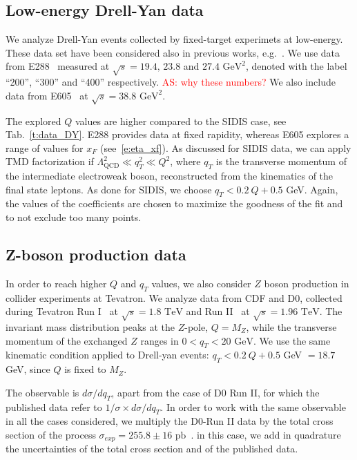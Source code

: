 \documentclass[aps,preprintnumbers,showpacs,nofootinbib,superscriptaddress,floatfix]{revtex4}
\begin{document}
\subsection{Low-energy Drell-Yan data}
\label{ss:dy}

We analyze Drell-Yan events collected by fixed-target experimets at low-energy. These data set have been considered also in previous works, e.g.~\cite{DAlesio:2014mrz}. 
We use data from E288~\cite{Ito:1980ev} measured at $\sqrt{s}=19.4,\,23.8$ and $27.4\text{ GeV}^2$, denoted with the label ``200'', ``300'' and ``400'' respectively. \textcolor{red}{AS: why these numbers?}
We also include data from E605~\cite{Moreno:1990sf} at $\sqrt{s}=38.8 \text{ GeV}^2$.

The explored $Q$ values are higher compared to the SIDIS case, see Tab.~\ref{t:data_DY}. E288 provides data at fixed rapidity, whereas E605 explores a range of values for $x_F$ (see~\eqref{e:eta_xf}).  
As discussed for SIDIS data, we can apply TMD factorization if $\Lambda_{\text{QCD}}^2 \ll q_T^2 \ll Q^2$, where $q_T$ is the transverse momentum of the intermediate electroweak boson, reconstructed from the kinematics of the final state leptons. As done for SIDIS, we choose $q_T < 0.2\ Q + 0.5$ GeV. Again, the values of the coefficients are chosen to maximize the goodness of the fit and to not exclude too many points.

\subsection{Z-boson production data}
\label{ss:zboson}

In order to reach higher $Q$ and $q_T$ values, we also consider $Z$ boson production in collider experiments at Tevatron. 
We analyze data from CDF and D0, collected during Tevatron Run I~\cite{Affolder:1999jh,Abbott:1999wk} at $\sqrt{s}=1.8\text{ TeV}$ and Run II~\cite{Aaltonen:2012fi,Abazov:2007ac} at $\sqrt{s}=1.96\text{ TeV}$. 
The invariant mass distribution peaks at the $Z$-pole, $Q=M_Z$, while the transverse momentum of the exchanged $Z$ ranges in $0< q_T < 20 \text{ GeV}$.
We use the same kinematic condition applied to Drell-yan events:  $q_T < 0.2\ Q + 0.5$ GeV $ = 18.7$ GeV, since $Q$ is fixed to $M_Z$. 

The observable is $d\sigma /dq_T$,  apart from the case of D0 Run II, for which the published data refer to $1/\sigma \times d\sigma/dq_T$. In order to work with the same observable in all the cases considered, we multiply the D0-Run II data by the total cross section of the process $\sigma_{exp} = 255.8 \pm 16 \text{ pb}$~\cite{Abazov:2007ac}. in this case, we add in quadrature the uncertainties of the total cross section and of the published data. 
\end{document}
